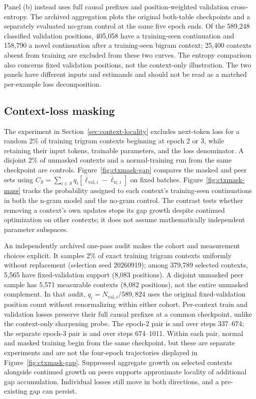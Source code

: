 Panel (b) instead uses full causal prefixes and position-weighted validation cross-entropy. The archived aggregation  plots the original both-table checkpoints and a separately evaluated no-gram control at the same five epoch ends. Of the 589{,}248 classified validation positions, 405{,}058 have a training-seen continuation and 158{,}790 a novel continuation after a training-seen bigram context; 25{,}400 contexts absent from training are excluded from these two curves. The entropy comparison also concerns fixed validation positions, not the context-only illustration. The two panels have different inputs and estimands and should not be read as a matched per-example loss decomposition.

\subsection{Context-loss masking}

The experiment in Section~\ref{sec:context-locality} excludes next-token loss for a random 2\% of training trigram contexts beginning at epoch 2 or 3, while retaining their input tokens, trainable parameters, and the loss denominator. A disjoint 2\% of unmasked contexts and a normal-training run from the same checkpoint are controls. Figure~\ref{fig:ctxmask-gap} compares the masked and peer sets using $C_S=\sum_{i\in S}q_i[\bar\ell_{\mathrm{val},i}-\bar\ell_{\mathrm{tr},i}]$ on fixed batches. Figure~\ref{fig:ctxmask-mass} tracks the probability assigned to each context's training-seen continuations in both the n-gram model and the no-gram control. The contrast tests whether removing a context's own updates stops its gap growth despite continued optimization on other contexts; it does not assume mathematically independent parameter subspaces.

An independently archived one-pass audit makes the cohort and measurement choices explicit. It samples 2\% of exact training trigram contexts uniformly without replacement (selection seed 20260919); among 379{,}789 selected contexts, 5{,}565 have fixed-validation support (8{,}083 positions). A disjoint unmasked peer sample has 5{,}571 measurable contexts (8{,}082 positions), not the entire unmasked complement. In that audit, $q_i=N_{\mathrm{val},i}/589{,}824$ uses the original fixed-validation position count without renormalizing within either cohort. Per-context train and validation losses preserve their full causal prefixes at a common checkpoint, unlike the context-only sharpening probe. The epoch-2 pair is  and  over steps 337--674; the separate epoch-3 pair is  and  over steps 674--1011. Within each pair, normal and masked training begin from the same checkpoint, but these are separate experiments and are not the four-epoch trajectories displayed in Figure~\ref{fig:ctxmask-gap}. Suppressed aggregate growth on selected contexts alongside continued growth on peers supports approximate locality of additional gap accumulation. Individual losses still move in both directions, and a pre-existing gap can persist.

